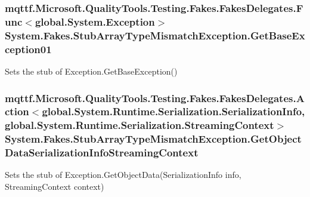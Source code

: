 \hypertarget{class_system_1_1_fakes_1_1_stub_array_type_mismatch_exception_a78c622d06c5f02a58f01d18a54278ff8}{
\subsubsection[{Get\-Base\-Exception01}]{\setlength{\rightskip}{0pt plus 5cm}mqttf.\-Microsoft.\-Quality\-Tools.\-Testing.\-Fakes.\-Fakes\-Delegates.\-Func$<$global.\-System.\-Exception$>$ System.\-Fakes.\-Stub\-Array\-Type\-Mismatch\-Exception.\-Get\-Base\-Exception01}}\label{class_system_1_1_fakes_1_1_stub_array_type_mismatch_exception_a78c622d06c5f02a58f01d18a54278ff8}


Sets the stub of Exception.\-Get\-Base\-Exception()

\hypertarget{class_system_1_1_fakes_1_1_stub_array_type_mismatch_exception_afbcd8b4da28da7a0c16489c045a2a479}{
\subsubsection[{Get\-Object\-Data\-Serialization\-Info\-Streaming\-Context}]{\setlength{\rightskip}{0pt plus 5cm}mqttf.\-Microsoft.\-Quality\-Tools.\-Testing.\-Fakes.\-Fakes\-Delegates.\-Action$<$global.\-System.\-Runtime.\-Serialization.\-Serialization\-Info, global.\-System.\-Runtime.\-Serialization.\-Streaming\-Context$>$ System.\-Fakes.\-Stub\-Array\-Type\-Mismatch\-Exception.\-Get\-Object\-Data\-Serialization\-Info\-Streaming\-Context}}\label{class_system_1_1_fakes_1_1_stub_array_type_mismatch_exception_afbcd8b4da28da7a0c16489c045a2a479}


Sets the stub of Exception.\-Get\-Object\-Data(\-Serialization\-Info info, Streaming\-Context context)

